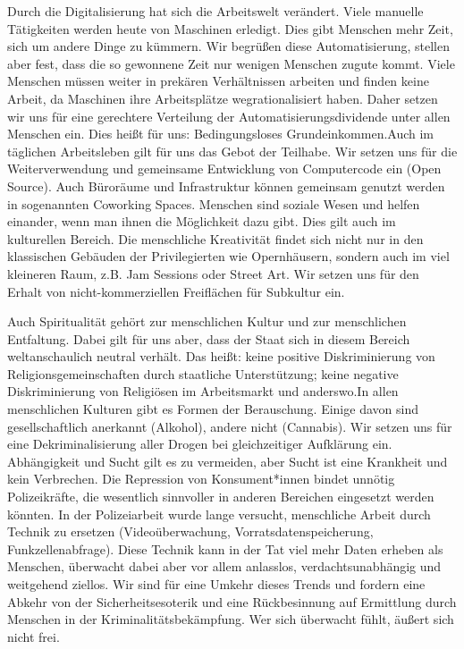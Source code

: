 \documentclass[a4paper,10pt]{article}
\begin{document}
Durch die Digitalisierung hat sich die Arbeitswelt verändert. Viele
manuelle Tätigkeiten werden heute von Maschinen erledigt. Dies gibt
Menschen mehr Zeit, sich um andere Dinge zu kümmern. Wir begrüßen diese
Automatisierung, stellen aber fest, dass die so gewonnene Zeit nur
wenigen Menschen zugute kommt. Viele Menschen müssen weiter in prekären
Verhältnissen arbeiten und finden keine Arbeit, da Maschinen ihre
Arbeitsplätze wegrationalisiert haben. Daher setzen wir uns für eine
gerechtere Verteilung der Automatisierungsdividende unter allen Menschen
ein. Dies heißt für uns: Bedingungsloses Grundeinkommen.Auch im
täglichen Arbeitsleben gilt für uns das Gebot der Teilhabe. Wir setzen
uns für die Weiterverwendung und gemeinsame Entwicklung von Computercode
ein (Open Source). Auch Büroräume und Infrastruktur können gemeinsam
genutzt werden in sogenannten Coworking Spaces. Menschen sind soziale
Wesen und helfen einander, wenn man ihnen die Möglichkeit dazu gibt.
Dies gilt auch im kulturellen Bereich. Die menschliche Kreativität
findet sich nicht nur in den klassischen Gebäuden der Privilegierten wie
Opernhäusern, sondern auch im viel kleineren Raum, z.B. Jam Sessions
oder Street Art. Wir setzen uns für den Erhalt von nicht-kommerziellen
Freiflächen für Subkultur ein.

\enlargethispage{-3em}
Auch Spiritualität gehört zur menschlichen Kultur und zur menschlichen
Entfaltung. Dabei gilt für uns aber, dass der Staat sich in diesem
Bereich weltanschaulich neutral verhält. Das heißt: keine positive
Diskriminierung von Religionsgemeinschaften durch staatliche
Unterstützung; keine negative Diskriminierung von Religiösen im
Arbeitsmarkt und anderswo.In allen menschlichen Kulturen gibt es Formen
der Berauschung. Einige davon sind gesellschaftlich anerkannt (Alkohol),
andere nicht (Cannabis). Wir setzen uns für eine Dekriminalisierung
aller Drogen bei gleichzeitiger Aufklärung ein. Abhängigkeit und Sucht
gilt es zu vermeiden, aber Sucht ist eine Krankheit und kein Verbrechen.
Die Repression von Konsument*innen bindet unnötig Polizeikräfte, die
wesentlich sinnvoller in anderen Bereichen eingesetzt werden könnten. In
der Polizeiarbeit wurde lange versucht, menschliche Arbeit durch Technik
zu ersetzen (Videoüberwachung, Vorratsdatenspeicherung,
Funkzellenabfrage). Diese Technik kann in der Tat viel mehr Daten
erheben als Menschen, überwacht dabei aber vor allem anlasslos,
verdachtsunabhängig und weitgehend ziellos. Wir sind für eine Umkehr
dieses Trends und fordern eine Abkehr von der Sicherheitsesoterik und
eine Rückbesinnung auf Ermittlung durch Menschen in der
Kriminalitätsbekämpfung. Wer sich überwacht fühlt, äußert sich nicht
frei.
\end{document}
